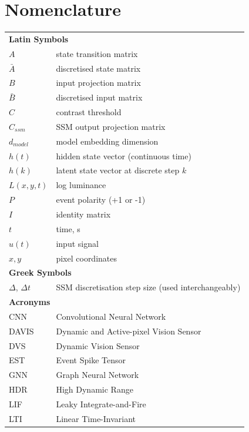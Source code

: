 \documentclass[11pt, a4paper]{report}
\begin{document}
\tableofcontents
\clearpage{}
\listoffigures
\clearpage{}
\listoftables

\chapter*{Nomenclature}
\begin{tabular}{ll}
\multicolumn{2}{l}{\textbf{Latin Symbols}} \\[4pt]
$A$ & state transition matrix \\
$\bar{A}$ & discretised state matrix \\
$B$ & input projection matrix \\
$\bar{B}$ & discretised input matrix \\
$C$ & contrast threshold \\
$C_{ssm}$ & SSM output projection matrix \\
$d_{model}$ & model embedding dimension \\
$h(t)$ & hidden state vector (continuous time) \\
$h(k)$ & latent state vector at discrete step $k$ \\
$L(x,y,t)$ & log luminance \\
$P$ & event polarity (+1 or -1) \\
$I$ & identity matrix \\
$t$ & time, s \\
$u(t)$ & input signal \\
$x, y$ & pixel coordinates \\[8pt]
\multicolumn{2}{l}{\textbf{Greek Symbols}} \\[4pt]
$\Delta$, $\Delta t$ & SSM discretisation step size (used interchangeably) \\[8pt]
\multicolumn{2}{l}{\textbf{Acronyms}} \\[4pt]
CNN & Convolutional Neural Network \\
DAVIS & Dynamic and Active-pixel Vision Sensor \\
DVS & Dynamic Vision Sensor \\
EST & Event Spike Tensor \\
GNN & Graph Neural Network \\
HDR & High Dynamic Range \\
LIF & Leaky Integrate-and-Fire \\
LTI & Linear Time-Invariant \\

\end{tabular}
\end{document}
